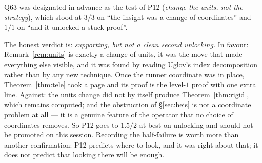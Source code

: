 \documentclass[11pt]{article}
\theoremstyle{definition}
\theoremstyle{remark}
\begin{document}
Q63 was designated in advance as the test of P12 (\emph{change the units, not the
strategy}), which stood at $3/3$ on ``the insight was a change of coordinates'' and
$1/1$ on ``and it unlocked a stuck proof''.

The honest verdict is: \emph{supporting, but not a clean second unlocking.} In favour:
Remark~\ref{rem:units} is exactly a change of units, it was the move that made
everything else visible, and it was found by reading Uglov's index decomposition rather
than by any new technique. Once the runner coordinate was in place,
Theorem~\ref{thm:tele} took a page and its proof is the level-$1$ proof with one extra
line. Against: the units change did not by itself produce Theorem~\ref{thm:rigid}, which
remains computed; and the obstruction of \S\ref{sec:heis} is not a coordinate problem at
all --- it is a genuine feature of the operator that no choice of coordinates removes.
So P12 goes to $1.5/2$ at best on unlocking and should not be promoted on this session.
Recording the half-failure is worth more than another confirmation: P12 predicts where
to look, and it was right about that; it does not predict that looking there will be
enough.
\end{document}
